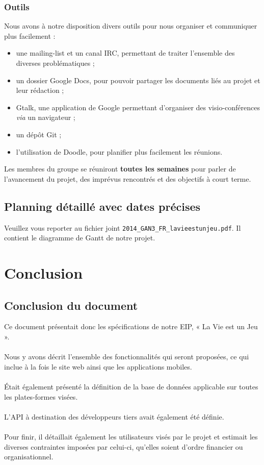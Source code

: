 \documentclass{life-fr}
\begin{document}
\subsection{ Outils}

Nous avons à notre disposition divers outils pour nous organiser et communiquer plus facilement :\\

\begin{itemize}
  \item une mailing-list et un canal IRC, permettant de traiter l'ensemble des diverses problématiques ;
  \item un dossier Google Docs, pour pouvoir partager les documents liés au projet et leur rédaction ;
  \item Gtalk, une application de Google permettant d'organiser des visio-conférences \textit{via} un navigateur ;
  \item un dépôt Git ;
  \item l'utilisation de Doodle, pour planifier plus facilement les réunions.
\end{itemize}

Les membres du groupe se réuniront \textbf{toutes les semaines} pour parler de l'avancement du projet, des imprévus rencontrés et des objectifs à court terme.


\section{Planning détaillé avec dates précises}

Veuillez vous reporter au fichier joint \texttt{2014\_GAN3\_FR\_lavieestunjeu.pdf}. Il contient le diagramme de Gantt de notre projet.


\chapter{Conclusion}

\section{Conclusion du document}

Ce document présentait donc les spécifications de notre EIP, « La Vie est un Jeu ».\\
\\
Nous y avons décrit l'ensemble des fonctionnalités qui seront proposées, ce qui inclue à la fois le site web ainsi que les applications mobiles.\\
\\
Était également présenté la définition de la base de données applicable sur toutes les plates-formes visées.\\
\\
L’API à destination des développeurs tiers avait également été définie.\\
\\
Pour finir, il détaillait également les utilisateurs visés par le projet et estimait les diverses contraintes imposées par celui-ci, qu’elles soient d’ordre financier ou organisationnel.\\
\end{document}
